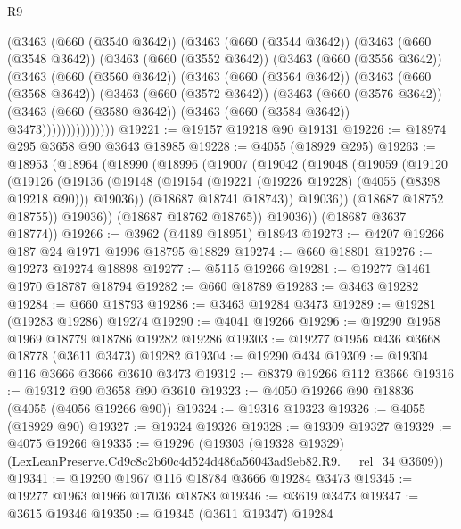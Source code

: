 \begin{lexlean}{R9}
\begin{coremodule}
          (@3463
            (@660 (@3540 @3642))
            (@3463
              (@660 (@3544 @3642))
              (@3463
                (@660 (@3548 @3642))
                (@3463
                  (@660 (@3552 @3642))
                  (@3463
                    (@660 (@3556 @3642))
                    (@3463
                      (@660 (@3560 @3642))
                      (@3463
                        (@660 (@3564 @3642))
                        (@3463
                          (@660 (@3568 @3642))
                          (@3463
                            (@660 (@3572 @3642))
                            (@3463
                              (@660 (@3576 @3642))
                              (@3463
                                (@660 (@3580 @3642))
                                (@3463 (@660 (@3584 @3642)) @3473)))))))))))))))
@19221 := @19157 @19218 @90 @19131
@19226 := @18974 @295 @3658 @90 @3643 @18985
@19228 := @4055 (@18929 @295)
@19263 := @18953
    (@18964
      (@18990
        (@18996
          (@19007
            (@19042
              (@19048
                (@19059
                  (@19120
                    (@19126
                      (@19136
                        (@19148 (@19154 (@19221 (@19226 @19228) (@4055 (@8398 @19218 @90))) @19036))
                        (@18687 @18741 @18743))
                      @19036))
                  (@18687 @18752 @18755))
                @19036))
            (@18687 @18762 @18765))
          @19036))
      (@18687 @3637 @18774))
@19266 := @3962 (@4189 @18951) @18943
@19273 := @4207 @19266 @187 @24 @1971 @1996 @18795 @18829
@19274 := @660 @18801
@19276 := @19273 @19274 @18898
@19277 := @5115 @19266
@19281 := @19277 @1461 @1970 @18787 @18794
@19282 := @660 @18789
@19283 := @3463 @19282
@19284 := @660 @18793
@19286 := @3463 @19284 @3473
@19289 := @19281 (@19283 @19286) @19274
@19290 := @4041 @19266
@19296 := @19290 @1958 @1969 @18779 @18786 @19282 @19286
@19303 := @19277 @1956 @436 @3668 @18778 (@3611 @3473) @19282
@19304 := @19290 @434
@19309 := @19304 @116 @3666 @3666 @3610 @3473
@19312 := @8379 @19266 @112 @3666
@19316 := @19312 @90 @3658 @90 @3610
@19323 := @4050 @19266 @90 @18836 (@4055 (@4056 @19266 @90))
@19324 := @19316 @19323
@19326 := @4055 (@18929 @90)
@19327 := @19324 @19326
@19328 := @19309 @19327
@19329 := @4075 @19266
@19335 := @19296
    (@19303 (@19328 @19329) (LexLeanPreserve.Cd9c8c2b60c4d524d486a56043ad9eb82.R9.__rel_34 @3609))
@19341 := @19290 @1967 @116 @18784 @3666 @19284 @3473
@19345 := @19277 @1963 @1966 @17036 @18783
@19346 := @3619 @3473
@19347 := @3615 @19346
@19350 := @19345 (@3611 @19347) @19284

\end{coremodule}
\end{lexlean}
